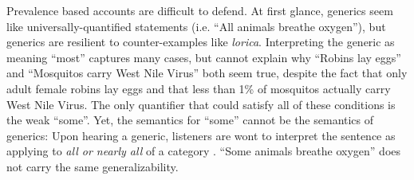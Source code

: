 \documentclass[10pt,letterpaper]{article}
\newcommand{\red}[1]{\textcolor{Red}{#1}}
\begin{document}
Prevalence based accounts are difficult to defend. 
At first glance, generics seem like universally-quantified statements (i.e. ``All animals breathe oxygen''), but generics are resilient to counter-examples like \emph{lorica}. 
Interpreting the generic as meaning ``most'' captures many cases, but cannot explain why ``Robins lay eggs'' and ``Mosquitos carry West Nile Virus'' both seem true, despite the fact that only adult female robins lay eggs and that less than 1\% of mosquitos actually carry West Nile Virus. 
The only quantifier that could satisfy all of these conditions is the weak ``some''.  
Yet, the semantics for ``some'' cannot be the semantics of generics:  Upon hearing a generic, listeners are wont to interpret the sentence as applying to \emph{all or nearly all} of a category \cite{Gelman2002, Cimpian2010}. 
``Some animals breathe oxygen'' does not carry the same generalizability.

%


%
%
%
%
\end{document}
